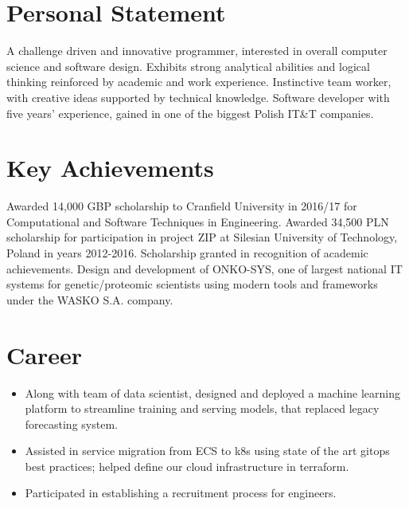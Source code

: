 \documentclass[12pt,english]{resume}
\begin{document}

	
	\section{Personal Statement}
		A challenge driven and innovative programmer, interested in overall computer
		science and software design. Exhibits strong analytical abilities and logical
		thinking reinforced by academic and work experience. Instinctive team worker,
		with creative ideas supported by technical knowledge. Software developer with
		five years’ experience, gained in one of the biggest Polish IT\&T companies.

	\section{Key Achievements}
		Awarded 14,000 GBP scholarship to Cranfield University in 2016/17 for Computational and Software Techniques in Engineering.
		Awarded 34,500 PLN scholarship for participation in project ZIP at Silesian University of Technology, Poland in years 2012-2016. Scholarship granted in recognition of academic achievements.
		Design and development of ONKO-SYS, one of largest national IT systems for genetic/proteomic scientists using modern tools and frameworks under the WASKO S.A. company.

	\section{Career}

		\begin{itemize}
			\item Along with team of data scientist, designed and deployed a machine learning platform to streamline training and serving models, that replaced legacy forecasting system.
			\item Assisted in service migration from ECS to k8s using state of the art gitops best practices; helped define our cloud infrastructure in terraform.
			\item Participated in establishing a recruitment process for engineers.
		\end{itemize}
\end{document}
